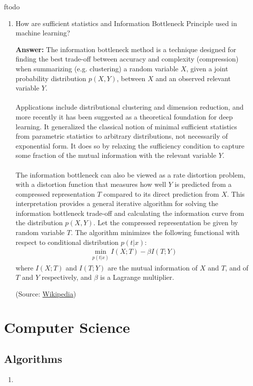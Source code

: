 ƒtodo\documentclass{article}
\newenvironment{QandA}{\begin{enumerate}[label=\arabic*.]}{\end{enumerate}}
\newenvironment{answer}{\par\normalfont \textbf{Answer:}}{}
\newcommand{\g}{\vert}
\begin{document}
\begin{QandA}
    \item How are sufficient statistics and Information Bottleneck Principle used in machine learning?
    \begin{answer}
        The information bottleneck method is a technique designed for finding the best trade-off between accuracy and complexity (compression) when summarizing (e.g. clustering) a random variable $X$, given a joint probability distribution $p(X, Y)$, between $X$ and an observed relevant variable $Y$. \\\\
        Applications include distributional clustering and dimension reduction, and more recently it has been suggested as a theoretical foundation for deep learning. It generalized the classical notion of minimal sufficient statistics from parametric statistics to arbitrary distributions, not necessarily of exponential form. It does so by relaxing the sufficiency condition to capture some fraction of the mutual information with the relevant variable $Y$. \\\\
        The information bottleneck can also be viewed as a rate distortion problem, with a distortion function that measures how well $Y$ is predicted from a compressed representation $T$ compared to its direct prediction from $X$. This interpretation provides a general iterative algorithm for solving the information bottleneck trade-off and calculating the information curve from the distribution $p(X,Y)$.
        Let the compressed representation be given by random variable $T$. The algorithm minimizes the following functional with respect to conditional distribution $p(t \g x)$:
        \begin{align*}
            \min_{p(t \g x)} I(X; T) - \beta I(T; Y)
        \end{align*}
        where $I(X; T)$ and $I(T; Y)$ are the mutual information of $X$ and $T$, and of $T$ and $Y$ respectively, and $\beta$ is a Lagrange multiplier.
        
        (Source: \href{https://en.wikipedia.org/wiki/Information_bottleneck_method}{Wikipedia})
    \end{answer}

\end{QandA}

\section{Computer Science}
\subsection{Algorithms}
\begin{QandA}
    \item 
\end{QandA}
\end{document}
